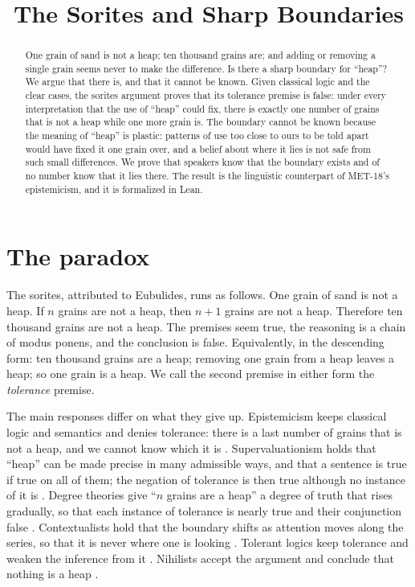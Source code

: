 \documentclass{situationist-preprint}
\title{The Sorites and Sharp Boundaries}
\begin{document}
\maketitle

\begin{abstract}
One grain of sand is not a heap; ten thousand grains are; and adding or removing a single grain seems never to make the difference. Is there a sharp boundary for \enquote{heap}? We argue that there is, and that it cannot be known. Given classical logic and the clear cases, the sorites argument proves that its tolerance premise is false: under every interpretation that the use of \enquote{heap} could fix, there is exactly one number of grains that is not a heap while one more grain is. The boundary cannot be known because the meaning of \enquote{heap} is plastic: patterns of use too close to ours to be told apart would have fixed it one grain over, and a belief about where it lies is not safe from such small differences. We prove that speakers know that the boundary exists and of no number know that it lies there. The result is the linguistic counterpart of MET-18's epistemicism, and it is formalized in Lean.
\end{abstract}

\section{The paradox}

The sorites, attributed to Eubulides, runs as follows. One grain of sand is not a heap. If $n$ grains are not a heap, then $n+1$ grains are not a heap. Therefore ten thousand grains are not a heap. The premises seem true, the reasoning is a chain of modus ponens, and the conclusion is false. Equivalently, in the descending form: ten thousand grains are a heap; removing one grain from a heap leaves a heap; so one grain is a heap. We call the second premise in either form the \emph{tolerance} premise.

The main responses differ on what they give up. Epistemicism keeps classical logic and semantics and denies tolerance: there is a last number of grains that is not a heap, and we cannot know which it is \citep{Williamson1994,Sorensen2001}. Supervaluationism holds that \enquote{heap} can be made precise in many admissible ways, and that a sentence is true if true on all of them; the negation of tolerance is then true although no instance of it is \citep{Fine1975,Keefe2000}. Degree theories give \enquote{$n$ grains are a heap} a degree of truth that rises gradually, so that each instance of tolerance is nearly true and their conjunction false \citep{Smith2008}. Contextualists hold that the boundary shifts as attention moves along the series, so that it is never where one is looking \citep{Raffman1994,Graff2000}. Tolerant logics keep tolerance and weaken the inference from it \citep{Zardini2008,CobrerosEtAl2012}. Nihilists accept the argument and conclude that nothing is a heap \citep{Unger1979}.
\end{document}
